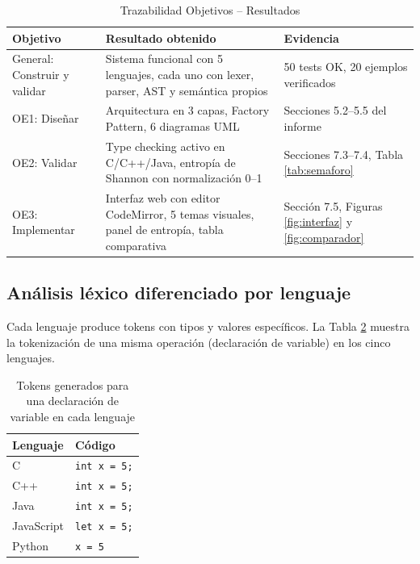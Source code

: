 \documentclass[12pt,a4paper]{article}
\begin{document}
\begin{table}[H]
\centering
\small
\caption{Trazabilidad Objetivos -- Resultados}
\label{tab:trazabilidad}
\begin{tabular}{@{}p{2.8cm}p{4.5cm}p{5cm}@{}}
\toprule
\textbf{Objetivo} & \textbf{Resultado obtenido} & \textbf{Evidencia} \\
\midrule
General: Construir y validar & Sistema funcional con 5 lenguajes, cada uno con lexer, parser, AST y semántica propios & 50 tests OK, 20 ejemplos verificados \\
\addlinespace
OE1: Diseñar & Arquitectura en 3 capas, Factory Pattern, 6 diagramas UML & Secciones 5.2--5.5 del informe \\
\addlinespace
OE2: Validar & Type checking activo en C/C++/Java, entropía de Shannon con normalización 0--1 & Secciones 7.3--7.4, Tabla \ref{tab:semaforo} \\
\addlinespace
OE3: Implementar & Interfaz web con editor CodeMirror, 5 temas visuales, panel de entropía, tabla comparativa & Sección 7.5, Figuras \ref{fig:interfaz} y \ref{fig:comparador} \\
\bottomrule
\end{tabular}
\end{table}

\subsection{Análisis léxico diferenciado por lenguaje}

Cada lenguaje produce tokens con tipos y valores específicos. La Tabla \ref{tab:tokens} muestra la tokenización de una misma operación (declaración de variable) en los cinco lenguajes.

\begin{table}[H]
\centering
\caption{Tokens generados para una declaración de variable en cada lenguaje}
\label{tab:tokens}
\begin{tabular}{@{}ll@{}}
\toprule
\textbf{Lenguaje} & \textbf{Código} \\
\midrule
C & \texttt{int x = 5;} \\
C++ & \texttt{int x = 5;} \\
Java & \texttt{int x = 5;} \\
JavaScript & \texttt{let x = 5;} \\
Python & \texttt{x = 5} \\
\bottomrule
\end{tabular}
\end{table}
\end{document}
